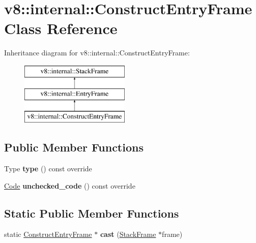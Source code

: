 \hypertarget{classv8_1_1internal_1_1ConstructEntryFrame}{}\section{v8\+:\+:internal\+:\+:Construct\+Entry\+Frame Class Reference}
\label{classv8_1_1internal_1_1ConstructEntryFrame}
Inheritance diagram for v8\+:\+:internal\+:\+:Construct\+Entry\+Frame\+:\begin{figure}[H]
\begin{center}
\leavevmode
\includegraphics[height=3.000000cm]{classv8_1_1internal_1_1ConstructEntryFrame}
\end{center}
\end{figure}
\subsection*{Public Member Functions}
\begin{DoxyCompactItemize}
\item 
\mbox{\label{classv8_1_1internal_1_1ConstructEntryFrame_a103a8ae38b10abb0578357408497fa03}} 
Type {\bfseries type} () const override
\item 
\mbox{\label{classv8_1_1internal_1_1ConstructEntryFrame_a1e47c52085baf944136fb5bdfe68fe5c}} 
\mbox{\hyperlink{classv8_1_1internal_1_1Code}{Code}} {\bfseries unchecked\+\_\+code} () const override
\end{DoxyCompactItemize}
\subsection*{Static Public Member Functions}
\begin{DoxyCompactItemize}
\item 
\mbox{\label{classv8_1_1internal_1_1ConstructEntryFrame_aeba52dabf334d529bc4614899e71f19d}} 
static \mbox{\hyperlink{classv8_1_1internal_1_1ConstructEntryFrame}{Construct\+Entry\+Frame}} $\ast$ {\bfseries cast} (\mbox{\hyperlink{classv8_1_1internal_1_1StackFrame}{Stack\+Frame}} $\ast$frame)
\end{DoxyCompactItemize}
